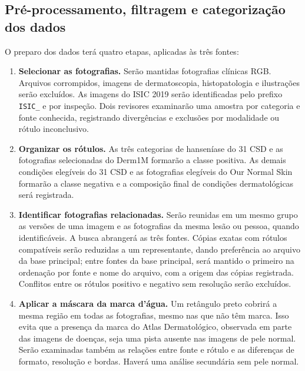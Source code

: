 \subsection{Pré-processamento, filtragem e categorização dos dados}
\label{subsec:curadoria-procedencia}

O preparo dos dados terá quatro etapas, aplicadas às três fontes:

\begin{enumerate}
	\item \textbf{Selecionar as fotografias.} Serão mantidas fotografias
	      clínicas RGB. Arquivos corrompidos, imagens de dermatoscopia,
	      histopatologia e ilustrações serão excluídos. As imagens do ISIC
	      2019 serão identificadas pelo prefixo \texttt{ISIC\_} e por
	      inspeção. Dois revisores examinarão uma amostra por categoria e
	      fonte conhecida, registrando divergências e exclusões por
	      modalidade ou rótulo inconclusivo.
	\item \textbf{Organizar os rótulos.} As três categorias de hanseníase do
	      31 CSD e as fotografias selecionadas do
	      Derm1M formarão a classe positiva. As demais condições elegíveis do 31 CSD e as fotografias
	      elegíveis do Our Normal Skin formarão a classe negativa e a composição final de condições dermatológicas será
	      registrada.
	\item \textbf{Identificar fotografias relacionadas.} Serão reunidas em
	      um mesmo grupo as versões de uma imagem e as fotografias da mesma
	      lesão ou pessoa, quando identificáveis. A busca abrangerá as três fontes. Cópias exatas
	      com rótulos compatíveis serão reduzidas a um representante, dando
	      preferência ao arquivo da base principal; entre fontes da base
	      principal, será mantido o primeiro na ordenação por fonte e nome
	      do arquivo, com a origem das cópias registrada. Conflitos entre os rótulos
	      positivo e negativo sem resolução serão excluídos.
	\item \textbf{Aplicar a máscara da marca d'água.} Um retângulo preto
	      cobrirá a mesma região em todas as fotografias, mesmo nas que não
	      têm marca. Isso evita que a presença da marca do Atlas
	      Dermatológico, observada em parte das imagens de doenças, seja uma
	      pista ausente nas imagens de pele normal. Serão examinadas também
	      as relações entre fonte e rótulo e as diferenças de formato,
	      resolução e bordas. Haverá uma análise secundária sem pele normal.
\end{enumerate}

